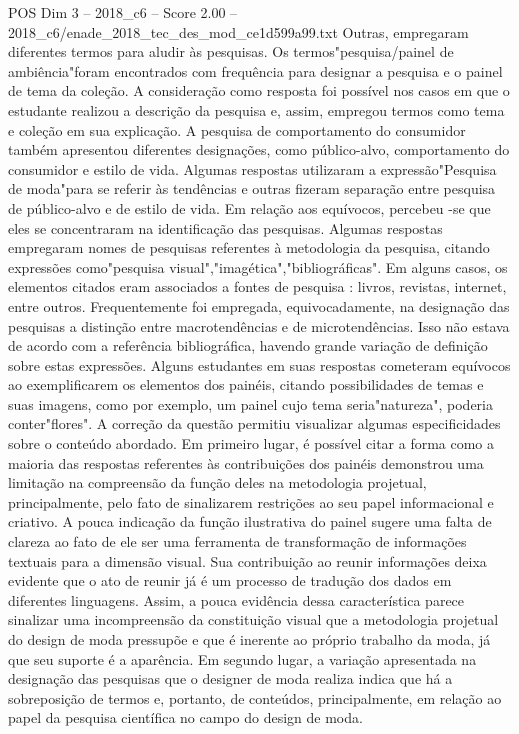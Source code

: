 \begin{textsample}{POS Dim 3 – 2018\_c6 – Score 2.00 – 2018\_c6/enade\_2018\_tec\_des\_mod\_ce1d599a99.txt}
Outras, empregaram diferentes termos para aludir às pesquisas.
Os termos"pesquisa/painel de ambiência"foram encontrados com frequência para designar a pesquisa e o painel de tema da coleção.
A consideração como resposta foi possível nos casos em que o estudante realizou a descrição da pesquisa e, assim, empregou termos como tema e coleção em sua explicação.
A pesquisa de comportamento do consumidor também apresentou diferentes designações, como público-alvo, comportamento do consumidor e estilo de vida.
Algumas respostas utilizaram a expressão"Pesquisa de moda"para se referir às tendências e outras fizeram separação entre pesquisa de público-alvo e de estilo de vida.
Em relação aos equívocos, percebeu -se que eles se concentraram na identificação das pesquisas.
Algumas respostas empregaram nomes de pesquisas referentes à metodologia da pesquisa, citando expressões como"pesquisa visual","imagética","bibliográficas".
Em alguns casos, os elementos citados eram associados a fontes de pesquisa : livros, revistas, internet, entre outros.
Frequentemente foi empregada, equivocadamente, na designação das pesquisas a distinção entre macrotendências e de microtendências.
Isso não estava de acordo com a referência bibliográfica, havendo grande variação de definição sobre estas expressões.
Alguns estudantes em suas respostas cometeram equívocos ao exemplificarem os elementos dos painéis, citando possibilidades de temas e suas imagens, como por exemplo, um painel cujo tema seria"natureza", poderia conter"flores".
A correção da questão permitiu visualizar algumas especificidades sobre o conteúdo abordado.
Em primeiro lugar, é possível citar a forma como a maioria das respostas referentes às contribuições dos painéis demonstrou uma limitação na compreensão da função deles na metodologia projetual, principalmente, pelo fato de sinalizarem restrições ao seu papel informacional e criativo.
A pouca indicação da função ilustrativa do painel sugere uma falta de clareza ao fato de ele ser uma ferramenta de transformação de informações textuais para a dimensão visual.
Sua contribuição ao reunir informações deixa evidente que o ato de reunir já é um processo de tradução dos dados em diferentes linguagens.
Assim, a pouca evidência dessa característica parece sinalizar uma incompreensão da constituição visual que a metodologia projetual do design de moda pressupõe e que é inerente ao próprio trabalho da moda, já que seu suporte é a aparência.
Em segundo lugar, a variação apresentada na designação das pesquisas que o designer de moda realiza indica que há a sobreposição de termos e, portanto, de conteúdos, principalmente, em relação ao papel da pesquisa científica no campo do design de moda.

\end{textsample}
